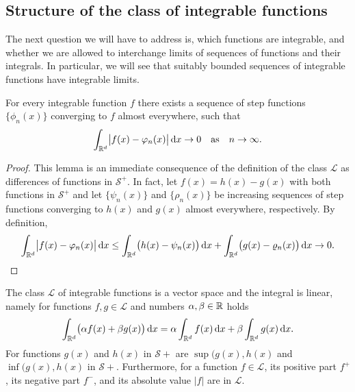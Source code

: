 \subsection{Structure of the class of integrable functions}

\begin{intro}
  The next question we will have to address is, which functions are
  integrable, and whether we are allowed to interchange limits of
  sequences of functions and their integrals. In particular, we will
  see that suitably bounded sequences of integrable functions have
  integrable limits.
\end{intro}

\begin{lemma}
  For every integrable function $f$ there exists a sequence of step
  functions $\{\phi_n(x)\}$ converging to $f$ almost everywhere, such
  that
  \begin{gather*}
    \int_{\mathbb R^d} \bigl|f(x)-\varphi_n(x)\bigr|\,\mathrm{d} x \to 0
    \quad\text{as}\quad n\to \infty.
  \end{gather*}
\end{lemma}

\begin{proof}
  This lemma is an immediate consequence of the definition of the
  class $\mathcal L$ as differences of functions in $\mathcal S^+$. In
  fact, let $f(x) = h(x)-g(x)$ with both functions in $\mathcal
  S^+$ and let $\{\psi_n(x)\}$ and $\{\rho_n(x)\}$ be increasing
  sequences of step functions converging to $h(x)$ and $g(x)$
  almost everywhere, respectively. By definition,
  \begin{gather*}
    \int_{\mathbb R^d} \bigl|f(x)-\varphi_n(x)\bigr|\,\mathrm{d} x
    \le \int_{\mathbb R^d} \bigl(h(x)-\psi_n(x)\bigr)\,\mathrm{d} x
    + \int_{\mathbb R^d} \bigl(g(x)-\varrho_n(x)\bigr)\,\mathrm{d} x
    \to 0.
  \end{gather*}
\end{proof}

\begin{theorem}
  The class $\mathcal L$ of integrable functions is a vector space and
  the integral is linear, namely for functions $f,g\in \mathcal L$ and
  numbers $\alpha,\beta\in \mathbb R$ holds
  \begin{gather*}
    \int_{\mathbb R^d} \bigl(\alpha f(x)+\beta g(x) \bigr)\,\mathrm{d} x
    =\alpha \int_{\mathbb R^d} f(x)\,\mathrm{d} x
    +\beta\int_{\mathbb R^d} g(x)\,\mathrm{d} x.
  \end{gather*}
  For functions $g(x)$ and $h(x)$ in $\mathcal S+$ are
  $\sup(g(x),h(x)$ and  $\inf(g(x),h(x)$ in $\mathcal S+$.
  Furthermore, for a function $f\in \mathcal L$, its positive part
  $f^+$, its negative part $f^-$, and its absolute value $|f|$ are in
  $\mathcal L$.
\end{theorem}

